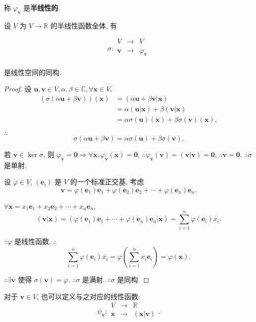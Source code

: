 \documentclass{ctexart}
\begin{document}
称 $\varphi_{\boldsymbol{v}}$ 是\textbf{半线性的}.

设 $\underline{V}$ 为 $V\to\mathbb{R}$ 的半线性函数全体, 有
\begin{theorem}\label{t2.2}
    \[\sigma:\begin{array}{rcl}
        V & \to & \underline{V} \\
        \boldsymbol{v} & \to & \varphi_{\boldsymbol{v}} \\
    \end{array}\]

    是线性空间的同构.
\end{theorem}
\begin{proof}
    设 $\boldsymbol{u},\boldsymbol{v}\in V,\alpha,\beta\in\mathbb{C},\forall\boldsymbol{x}\in V$,
    \begin{align*}
        (\sigma(\alpha\boldsymbol{u}+\beta\boldsymbol{v}))(\boldsymbol{x}) & =(\alpha\boldsymbol{u}+\beta\boldsymbol{v}|\boldsymbol{x}) \\
        & =\alpha(\boldsymbol{u}|\boldsymbol{x})+\beta(\boldsymbol{v}|\boldsymbol{x}) \\
        & =\alpha\sigma(\boldsymbol{u})(\boldsymbol{x})+\beta\sigma(\boldsymbol{v})(\boldsymbol{x}),
    \end{align*}

    $\therefore$
    \[\sigma(\alpha\boldsymbol{u}+\beta\boldsymbol{v})=\alpha\sigma(\boldsymbol{u})+\beta\sigma(\boldsymbol{v}).\]

    若 $\boldsymbol{v}\in\ker\sigma$, 则 $\varphi_{\boldsymbol{v}}=\boldsymbol{0}\Rightarrow\forall\boldsymbol{x},\varphi_{\boldsymbol{v}}(\boldsymbol{x})=\boldsymbol{0}$, $\therefore\varphi_{\boldsymbol{v}}(\boldsymbol{v})=(\boldsymbol{v}|\boldsymbol{v})=\boldsymbol{0}$, $\therefore\boldsymbol{v}=\boldsymbol{0}$. $\therefore\sigma$ 是单射.

    设 $\varphi\in\underline{V}$, $(\boldsymbol{e}_i)$ 是 $V$ 的一个标准正交基, 考虑
    \[\boldsymbol{v}=\varphi(\boldsymbol{e}_1)\boldsymbol{e}_1+\varphi(\boldsymbol{e}_2)\boldsymbol{e}_2+\cdots+\varphi(\boldsymbol{e}_n)\boldsymbol{e}_n.\]

    $\forall\boldsymbol{x}=x_1\boldsymbol{e}_1+x_2\boldsymbol{e}_2+\cdots+x_n\boldsymbol{e}_n$,
    \[(\boldsymbol{v}|\boldsymbol{x})=(\varphi(\boldsymbol{e}_1)\boldsymbol{e}_1+\cdots+\varphi(\boldsymbol{e}_n)\boldsymbol{e}_n|\boldsymbol{x})=\sum\limits_{i=1}^n\varphi(\boldsymbol{e}_i)\overline{x_i}.\]

    $\because\varphi$ 是线性函数, $\therefore$
    \[\sum\limits_{i=1}^n\varphi(\boldsymbol{e}_i)\overline{x_i}=\varphi\left(\sum\limits_{i=1}^n\overline{x_i}\boldsymbol{e}_i\right)=\varphi(\boldsymbol{x}).\]

    $\therefore\exists\boldsymbol{v}$ 使得 $\sigma(\boldsymbol{v})=\varphi$. $\therefore\sigma$ 是满射. $\therefore\sigma$ 是同构.
\end{proof}
对于 $\boldsymbol{v}\in V$, 也可以定义与之对应的线性函数:
\[\psi_{\boldsymbol{v}}:\begin{array}{rcl}
    V & \to & \mathbb{R} \\
    \boldsymbol{x} & \to & (\boldsymbol{x}|\boldsymbol{v}) \\
\end{array}.\]
\end{document}
